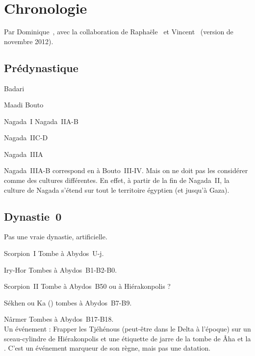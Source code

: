 
\chapter{Chronologie}

Par Dominique~, avec la collaboration de 
Raphaële~ et Vincent~ 
(version de novembre 2012).

\section{Prédynastique}

\begin{listerois}
  \item [\HE Badari \datation{(\anorange{4500}{3800})}] ~\\
  \item [\BE Maadi Bouto \datation{(environ \anorange{4000}{3400})}]
  \item [\HE Nagada~I Nagada~IIA-B 
         \datation{(environ \anorange{3800}{3600})}]
  \item [\HE Nagada~IIC-D \datation{(environ \anorange{3600}{3300})}]
  \item [\HE Nagada~IIIA \datation{(environ \anorange{3300}{3250})}]
\end{listerois}

Nagada~IIIA-B correspond en \BE à Bouto~III-IV. Mais on ne doit pas 
les considérer comme des cultures différentes. En effet, à partir de 
la fin de Nagada~II, la culture de Nagada s'étend sur tout le 
territoire égyptien (et jusqu'à Gaza).

\section{Dynastie~0}

Pas une vraie dynastie, artificielle.


\begin{listerois}
  \item [\og Scorpion~I \fg] Tombe à Abydos~U-j.
  \item [Iry-Hor] Tombes à Abydos~B1-B2-B0.
  \item [Scorpion~\og II \fg] Tombe à Abydos~B50 ou à Hiérakonpolis ?
  \item [Sékhen ou Ka (\nospace{?})] tombes à Abydos~B7-B9.
  \item [Nârmer] Tombes à Abydos~B17-B18. \\
        Un événement : \og Frapper les Tjéhénous \fg (peut-être 
        dans le Delta à l'époque) sur un sceau-cylindre de 
        Hiérakonpolis et une étiquette de jarre de la tombe de 
        Âha et la .
        C'est un événement marqueur de son règne, mais pas une 
        datation.
\end{listerois}

